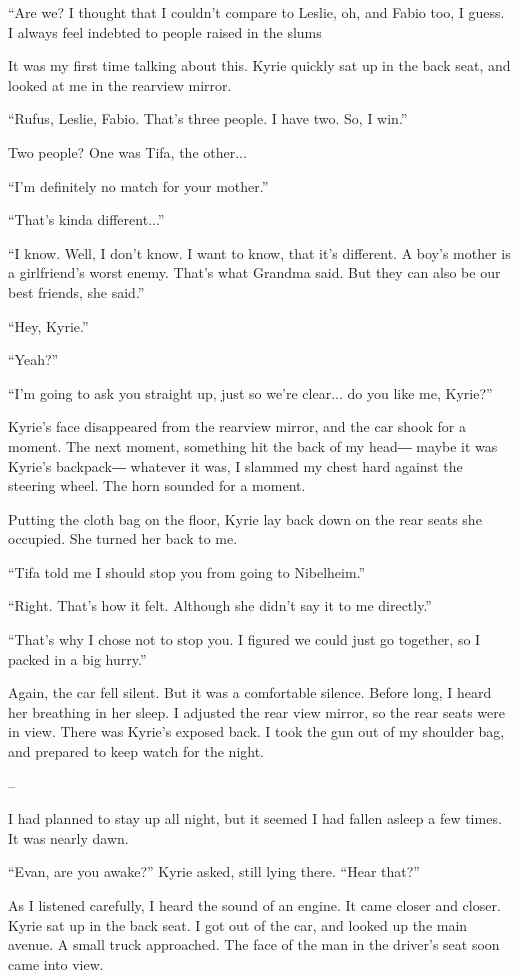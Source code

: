 \documentclass[oneside]{book}
\begin{document}
“Are we? I thought that I couldn’t compare to Leslie, oh, and Fabio too, I guess. I always feel indebted to people raised in the slums

It was my first time talking about this. Kyrie quickly sat up in the back seat, and looked at me in the rearview mirror.

“Rufus, Leslie, Fabio. That’s three people. I have two. So, I win.”

Two people? One was Tifa, the other...

“I’m definitely no match for your mother.”

“That’s kinda different...”

“I know. Well, I don’t know. I want to know, that it’s different. A boy’s mother is a girlfriend’s worst enemy. That’s what Grandma said. But they can also be our best friends, she said.”

“Hey, Kyrie.”

“Yeah?”

“I’m going to ask you straight up, just so we’re clear... do you like me, Kyrie?”

Kyrie’s face disappeared from the rearview mirror, and the car shook for a moment. The next moment, something hit the back of my head― maybe it was Kyrie’s backpack― whatever it was, I slammed my chest hard against the steering wheel. The horn sounded for a moment.

Putting the cloth bag on the floor, Kyrie lay back down on the rear seats she occupied. She turned her back to me.

“Tifa told me I should stop you from going to Nibelheim.”

“Right. That’s how it felt. Although she didn’t say it to me directly.”

“That’s why I chose not to stop you. I figured we could just go together, so I packed in a big hurry.”

Again, the car fell silent. But it was a comfortable silence. Before long, I heard her breathing in her sleep. I adjusted the rear view mirror, so the rear seats were in view. There was Kyrie’s exposed back. I took the gun out of my shoulder bag, and prepared to keep watch for the night.

–

I had planned to stay up all night, but it seemed I had fallen asleep a few times. It was nearly dawn.

“Evan, are you awake?” Kyrie asked, still lying there. “Hear that?”

As I listened carefully, I heard the sound of an engine. It came closer and closer. Kyrie sat up in the back seat. I got out of the car, and looked up the main avenue. A small truck approached. The face of the man in the driver’s seat soon came into view.
\end{document}
